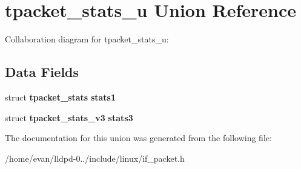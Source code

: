 \section{tpacket\-\_\-stats\-\_\-u \-Union \-Reference}
\label{uniontpacket__stats__u}


\-Collaboration diagram for tpacket\-\_\-stats\-\_\-u\-:
\subsection*{\-Data \-Fields}
\begin{DoxyCompactItemize}
\item 
struct {\bf tpacket\-\_\-stats} {\bfseries stats1}\label{uniontpacket__stats__u_a6a76ffee064abfaa3db4f5a700d800f6}

\item 
struct {\bf tpacket\-\_\-stats\-\_\-v3} {\bfseries stats3}\label{uniontpacket__stats__u_a1947624b02f1d480afb2b84c3dfbe88a}

\end{DoxyCompactItemize}


\-The documentation for this union was generated from the following file\-:\begin{DoxyCompactItemize}
\item 
/home/evan/lldpd-\/0../include/linux/if\-\_\-packet.\-h\end{DoxyCompactItemize}

